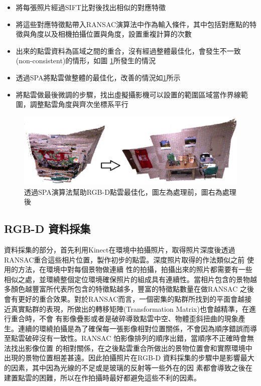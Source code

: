 \begin{itemize}
	\item 將每張照片經過SIFT比對後找出相似的對應特徵
	\item 將這些對應特徵點帶入RANSAC演算法中作為輸入條件，其中包括對應點的特徵與角度以及相機拍攝位置與角度，設置重複計算的次數
	\item 出來的點雲資料為區域之間的重合，沒有經過整體最佳化，會發生不一致(non-consistent)的情形，如圖 \ref{fig:Consistent_PL}所發生的情況
	\item 透過SPA將點雲做整體的最佳化，改善的情況如\ref{fig:Consistent_PL}所示
	\item 將點雲做最後微調的步驟，找出虛擬攝影機可以設置的範圍區域當作界線範圍，調整點雲角度與齊次坐標系平行
\end{itemize}
   
\begin{figure}
\begin{center}
  \includegraphics[width=1.0\textwidth]{figures/consistent_PL.eps}
  \caption{透過SPA演算法幫助RGB-D點雲最佳化，圖左為處理前，圖右為處理後}
  \label{fig:Consistent_PL}
\end{center}
\end{figure}   
   
\subsection{RGB-D 資料採集}

	資料採集的部分，首先利用Kinect在環境中拍攝照片，取得照片深度後透過RANSAC重合這些相片位置，製作初步的點雲。深度照片取得的作法類似之前 \cite{Du2011}使用的方法，在環境中對每個景物做連續
性的拍攝，拍攝出來的照片都需要有一些相似之處，並環繞整個定位環境確保照片的組成具有連續性。當相片包含的景物越多顏色越豐富所代表所包含的特徵點越多，豐富的特徵點數量在做RANSAC
之後會有更好的重合效果。對於RANSAC而言，一個密集的點群所找到的平面會越接近真實點群的表現，所做出的轉移矩陣(Transformation Matrix)也會越精準，在進行重合時，不會
有影像疊影或者是破碎導致點雲中空、物體歪斜扭曲的現象產生。連續的環繞拍攝是為了確保每一張影像相對位置關係，不會因為順序錯誤而導至點雲破碎沒有一致性。RANSAC 怕影像排列的順序出錯，當順序不正確時會無法找出影像位置
的相對關係，在之後點雲重合所做出的景物位置會和實際環境中出現的景物位置相差甚遠。因此拍攝照片在RGB-D 資料採集的步驟中是影響最大的因素，其中因為光線的不足或是玻璃的反射等一些外在的因
素都會導致之後在建置點雲的困難，所以在作拍攝時最好都避免這些不利的因素。
          
